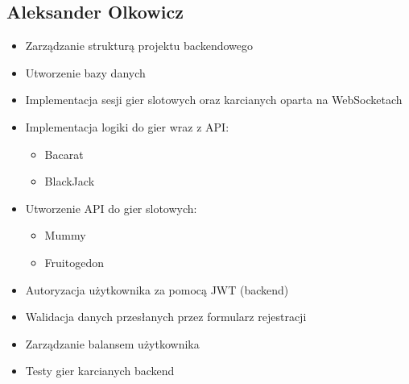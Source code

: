 \documentclass[a4paper,12pt]{article}
\begin{document}
\subsection{Aleksander Olkowicz}
\begin{itemize}
    \item Zarządzanie strukturą projektu backendowego
    \item Utworzenie bazy danych
    \item Implementacja sesji gier slotowych oraz karcianych oparta na WebSocketach
    \item Implementacja logiki do gier wraz z API:
    \begin{itemize}
        \item Bacarat
        \item BlackJack
    \end{itemize}
    \item Utworzenie API do gier slotowych:
    \begin{itemize}
        \item Mummy
        \item Fruitogedon
    \end{itemize}
    \item Autoryzacja użytkownika za pomocą JWT (backend)
    \item Walidacja danych przesłanych przez formularz rejestracji
    \item Zarządzanie balansem użytkownika
    \item Testy gier karcianych backend
\end{itemize}
\end{document}
